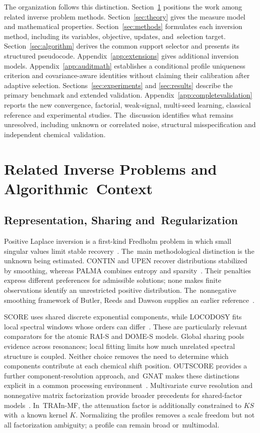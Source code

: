 \documentclass[mathematics,article,accept,moreauthors]{Definitions/mdpi}
\begin{document}
The organization follows this distinction. Section~\ref{sec:related} positions the work among related inverse problem methods. Section~\ref{sec:theory} gives the measure model and mathematical properties. Section~\ref{sec:methods} formulates each inversion method, including its variables, objective, updates, and~selection target. Section~\ref{sec:algorithm} derives the common support selector and presents its structured pseudocode. Appendix~\ref{app:extensions} gives additional inversion models. Appendix~\ref{app:auditmath} establishes a conditional profile uniqueness criterion and covariance-aware identities without claiming their calibration after adaptive selection. Sections~\ref{sec:experiments} and \ref{sec:results} describe the primary benchmark and extended validation. Appendix~\ref{app:completevalidation} reports the new convergence, factorial, weak-signal, multi-seed learning, classical reference and experimental studies. The~discussion identifies what remains unresolved, including unknown or correlated noise, structural misspecification and independent \mbox{chemical~validation.}



%


\section{Related Inverse Problems and Algorithmic~Context}\label{sec:related}

\subsection{Representation, Sharing and~Regularization}
Positive Laplace inversion is a first-kind Fredholm problem in which small singular values limit stable recovery~\cite{discrete,hansen}. The~main methodological distinction is the unknown being estimated. CONTIN and UPEN recover distributions stabilized by smoothing, whereas PALMA combines entropy and sparsity~\cite{contin,upen,palma}. Their penalties express different preferences for admissible solutions; none makes finite observations identify an unrestricted positive distribution. The~nonnegative smoothing framework of Butler, Reeds and Dawson supplies an earlier reference~\cite{brd}.

SCORE uses shared discrete exponential components, while LOCODOSY fits local spectral windows whose orders can differ~\cite{score,locodosy}. These are particularly relevant comparators for the atomic RAI-S and DOME-S models. Global sharing pools evidence across resonances; local fitting limits how much unrelated spectral structure is coupled. Neither choice removes the need to determine which components contribute at each chemical shift position. OUTSCORE provides a further component-resolution approach, and~GNAT makes these distinctions explicit in a common processing environment~\cite{outscore,gnat}. Multivariate curve resolution and nonnegative matrix factorization provide broader precedents for shared-factor models~\cite{mcr,nmf}. In~TRAIn-MF, the attenuation factor is additionally constrained to $KS$ with~a known kernel $K$. Normalizing the profiles removes a scale freedom but not all factorization ambiguity; a profile can remain broad or~multimodal.
\end{document}

